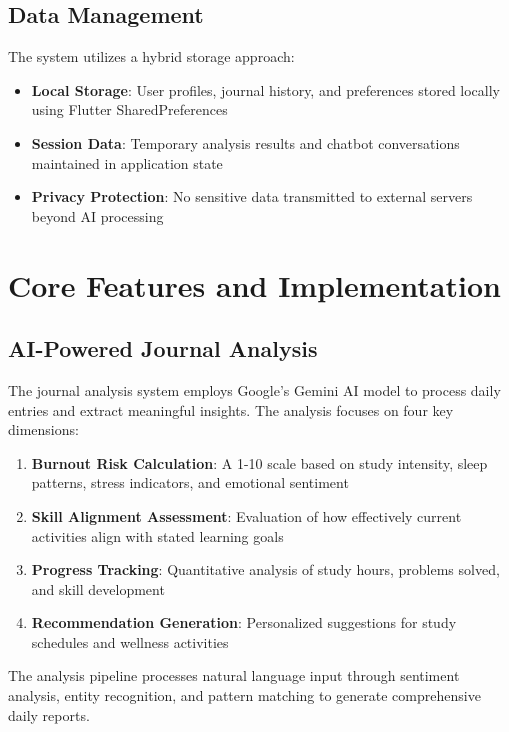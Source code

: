 \documentclass[conference,10pt]{IEEEtran}
\begin{document}
\subsection{Data Management}

The system utilizes a hybrid storage approach:

\begin{itemize}
\item \textbf{Local Storage}: User profiles, journal history, and preferences stored locally using Flutter SharedPreferences
\item \textbf{Session Data}: Temporary analysis results and chatbot conversations maintained in application state
\item \textbf{Privacy Protection}: No sensitive data transmitted to external servers beyond AI processing
\end{itemize}

\section{Core Features and Implementation}

\subsection{AI-Powered Journal Analysis}

The journal analysis system employs Google's Gemini AI model to process daily entries and extract meaningful insights. The analysis focuses on four key dimensions:

\begin{enumerate}
\item \textbf{Burnout Risk Calculation}: A 1-10 scale based on study intensity, sleep patterns, stress indicators, and emotional sentiment
\item \textbf{Skill Alignment Assessment}: Evaluation of how effectively current activities align with stated learning goals
\item \textbf{Progress Tracking}: Quantitative analysis of study hours, problems solved, and skill development
\item \textbf{Recommendation Generation}: Personalized suggestions for study schedules and wellness activities
\end{enumerate}

The analysis pipeline processes natural language input through sentiment analysis, entity recognition, and pattern matching to generate comprehensive daily reports.
\end{document}
